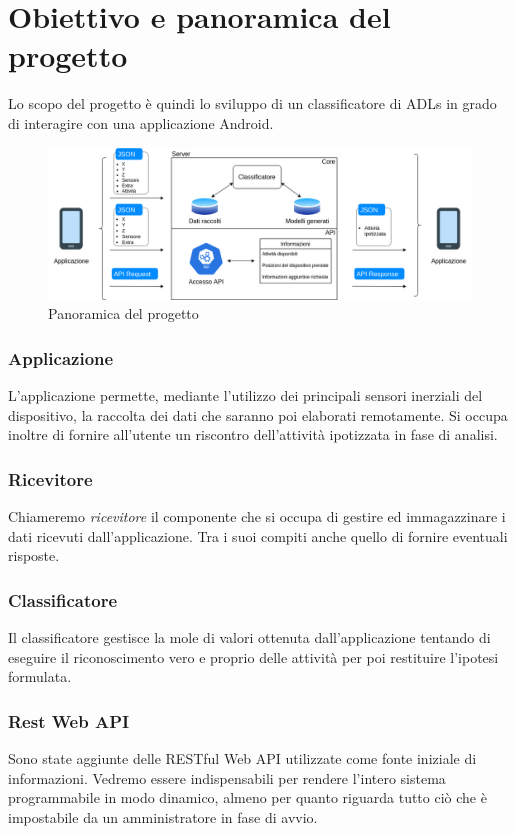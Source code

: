 \section{Obiettivo e panoramica del progetto}
Lo scopo del progetto è quindi lo sviluppo di un classificatore di ADLs in grado di interagire con una applicazione
Android.

\begin{figure}[H]
    \centering
    \includegraphics[scale = 0.41]{assets/images/overview.png}
    \caption{Panoramica del progetto}
    \label{fig:overview}
\end{figure}

\subsubsection{Applicazione}
L'applicazione permette, mediante l'utilizzo dei principali sensori inerziali del dispositivo, la raccolta dei dati che saranno poi elaborati 
remotamente. Si occupa inoltre di fornire all'utente un riscontro dell'attività ipotizzata in fase di analisi.
\subsubsection{Ricevitore}
Chiameremo \textit{ricevitore} il componente che si occupa di gestire ed immagazzinare i dati ricevuti dall'applicazione. 
Tra i suoi compiti anche quello di fornire eventuali risposte.
\subsubsection{Classificatore}
Il classificatore gestisce la mole di valori ottenuta 
dall'applicazione tentando di eseguire il riconoscimento vero e proprio delle attività 
per poi restituire l'ipotesi formulata.
\subsubsection{Rest Web API}
Sono state aggiunte delle RESTful Web API utilizzate come fonte iniziale di informazioni. 
Vedremo essere indispensabili per rendere l'intero sistema programmabile in modo dinamico, almeno per quanto riguarda 
tutto ciò che è impostabile da un amministratore in fase di avvio.